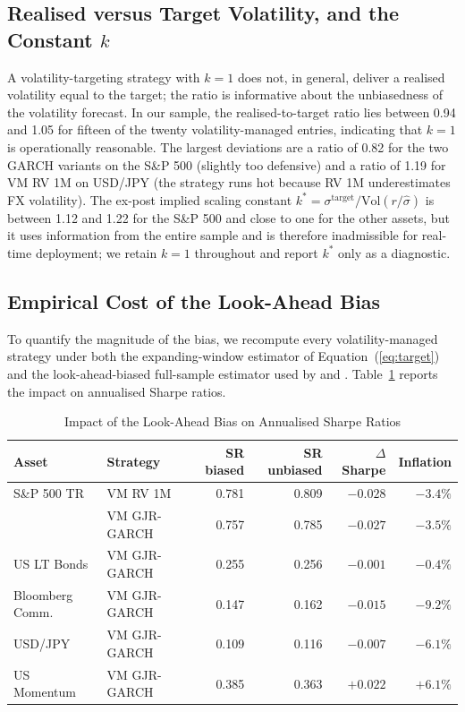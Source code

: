 \documentclass[12pt, a4paper]{article}
\newcommand{\stgt}{\sigma^{\mathrm{target}}}
\newcommand{\shat}{\hat{\sigma}}
\begin{document}
\subsection{Realised versus Target Volatility, and the Constant $k$}

A volatility-targeting strategy with $k=1$ does not, in general, deliver a realised
volatility equal to the target; the ratio is informative about the unbiasedness of the
volatility forecast. In our sample, the realised-to-target ratio lies between 0.94 and
1.05 for fifteen of the twenty volatility-managed entries, indicating that $k=1$ is
operationally reasonable. The largest deviations are a ratio of 0.82 for the two GARCH
variants on the S\&P 500 (slightly too defensive) and a ratio of 1.19 for VM RV 1M on
USD/JPY (the strategy runs hot because RV 1M underestimates FX volatility). The ex-post
implied scaling constant $k^*=\stgt/\mathrm{Vol}(r/\shat)$ is between 1.12 and 1.22 for the
S\&P 500 and close to one for the other assets, but it uses information from the entire
sample and is therefore inadmissible for real-time deployment; we retain $k=1$ throughout
and report $k^*$ only as a diagnostic.

\subsection{Empirical Cost of the Look-Ahead Bias}

To quantify the magnitude of the bias, we recompute every volatility-managed strategy
under both the expanding-window estimator of Equation~(\ref{eq:target}) and the
look-ahead-biased full-sample estimator used by \citet{moreira2017} and \citet{harvey2018}.
Table~\ref{tab:bias} reports the impact on annualised Sharpe ratios.

\begin{table}[H]
\centering
\footnotesize
\caption{Impact of the Look-Ahead Bias on Annualised Sharpe Ratios}
\label{tab:bias}
\begin{tabular}{llrrrr}
\toprule
\textbf{Asset} & \textbf{Strategy} & \textbf{SR biased} & \textbf{SR unbiased} & $\Delta$ Sharpe & \textbf{Inflation}\\
\midrule
S\&P 500 TR     & VM RV 1M     & 0.781 & 0.809 & $-0.028$ & $-3.4\%$\\
                & VM GJR-GARCH & 0.757 & 0.785 & $-0.027$ & $-3.5\%$\\
US LT Bonds     & VM GJR-GARCH & 0.255 & 0.256 & $-0.001$ & $-0.4\%$\\
Bloomberg Comm. & VM GJR-GARCH & 0.147 & 0.162 & $-0.015$ & $-9.2\%$\\
USD/JPY         & VM GJR-GARCH & 0.109 & 0.116 & $-0.007$ & $-6.1\%$\\
US Momentum     & VM GJR-GARCH & 0.385 & 0.363 & $+0.022$ & $+6.1\%$\\
\bottomrule
\end{tabular}
\end{table}
\end{document}
